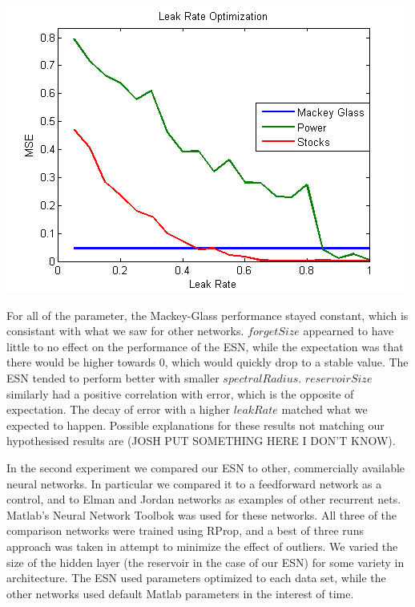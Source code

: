 \documentclass{acm_proc_article-sp}
\begin{document}
\includegraphics[scale=0.7]{LeakRateOptimization.png}

For all of the parameter, the Mackey-Glass performance stayed constant, which is consistant with what we saw for other networks. $forgetSize$ appearned to have little to no effect on the performance of the ESN, while the expectation was that there would be higher towards 0, which would quickly drop to a stable value. The ESN tended to perform better with smaller $spectralRadius$.  $reservoirSize$ similarly had a positive correlation with error, which is the opposite of expectation.  The decay of error with a higher $leakRate$ matched what we expected to happen.  Possible explanations for these results not matching our hypothesised results are (JOSH PUT SOMETHING HERE I DON'T KNOW).

In the second experiment we compared our ESN to other, commercially available neural networks. In particular we compared it to a feedforward network as a control, and to Elman and Jordan networks as examples of other recurrent nets. Matlab's Neural Network Toolbok was used for these networks. All three of the comparison networks were trained using RProp, and a best of three runs approach was taken in attempt to minimize the effect of outliers. We varied the size of the hidden layer (the reservoir in the case of our ESN) for some variety in architecture. The ESN used parameters optimized to each data set, while the other networks used default Matlab parameters in the interest of time.
\end{document}
